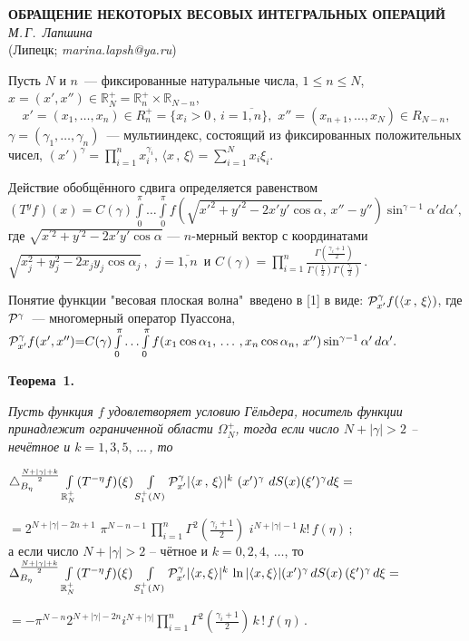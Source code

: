 \begin{center}{
	\bf
	ОБРАЩЕНИЕ НЕКОТОРЫХ ВЕСОВЫХ ИНТЕГРАЛЬНЫХ ОПЕРАЦИЙ
} \\
{\it М.\,Г.~Лапшина } \\
(Липецк; {\it marina.lapsh@ya.ru})
\end{center}


Пусть $N$ и $n$~--- фиксированные натуральные числа, $1\leqslant n\leqslant N $,
$x=(x',x'')\in \mathbb{R}_N^+=\mathbb{R}_n^+\times\mathbb{R}_{N-n}$,
$$x'{=}(x_1,\ldots,x_n)\in R_n^+{=}\{x_i{>}0\,,\, i{=}\overline{1,n}\},\,\,
x''{=}(x_{n+1},\ldots,x_N)\in R_{N{-}n},$$
$\gamma{=}(\gamma_1,\ldots,\gamma_n)$~--- мультииндекс, состоящий из
фиксированных положительных чисел, $(x')^\gamma=\prod_{i=1}^n x_i^{\gamma_i}$,
$\langle x\,,\,\xi\rangle{=}\sum_{i=1}^{N}x_i\xi_i$.

Действие обобщённого сдвига определяется  равенством\\
$
(T^y f)(x){=}C(\gamma)\int\limits_{0}^{\pi}
\ldots \int\limits_{0}^{\pi}
f\left(\sqrt{x'^2{+}y'^2{-}2x'y'\cos\alpha},\,
 x''{-}y''\right)\sin^{\gamma-1}\alpha' d\alpha',
$ \\
где $\sqrt{x^{'2}+y^{'2}-2x'y'\cos\alpha}$ --- $n$-мерный вектор  с координатами\\
$\sqrt{x_j^{2}+y_j^{2}-2x_jy_j\cos\alpha_j}\,,\,\,\, j=\overline{1,n}$\, и
$
C(\gamma)=\prod\limits_{i=1}^n\frac{\Gamma\left(\frac{\gamma_i+1}{2}\right)}
{\Gamma\left(\frac{1}{2}\right)\Gamma\left(\frac{\gamma_i}{2}\right)}\,.
$

Понятие функции "весовая плоская волна"\, введено в [1] в виде:
${\cal P}^\gamma_{x'} f(\langle x\,,\,\xi\rangle)$,
где ${\cal P}^\gamma$~--- многомерный оператор Пуассона,\\
$
{\cal P}^\gamma_{x'} f(x',x''){=}C(\gamma)
\int\limits_0^\pi\ldots \int\limits_0^\pi f(x_1\cos\alpha_1,\,\ldots\,,x_n\cos\alpha_n,\,x'')
\sin^{\gamma-1}\alpha'\,d\alpha'.
$

\smallskip
\textbf{Теорема~1.}
{\it Пусть функция $f$ удовлетворяет условию Гёльдера, носитель функции принадлежит ограниченной области $\Omega_{N}^+$,
тогда если число $N+|\gamma|>2$ -- нечётное и $k=1,3,5,\,\ldots\,$, то

$
\triangle_{B_{\eta}}^{\frac{N+|\gamma|+k}{2}}
\int\limits_{\mathbb{R}_N^+}(T^{-\eta}f)(\xi)
\int\limits_{S^+_1(N)}{\cal P}_{x'}^\gamma |\langle x\,,\,\xi\rangle|^k\,\,
(x')^\gamma\,\,dS(x)(\xi')^{\gamma} d\xi=
$

$
=2^{N+|\gamma|-2n+1}\,\,
\pi^{N-n-1}\,
\prod\limits_{i=1}^{n}\Gamma^2\left(\frac{\gamma_i+1}{2}\right)
\,\,i^{N+|\gamma|-1}\,k!
\, f(\eta)\,;
$\\
а если
число $N+|\gamma|>2$ -- чётное и $k=0,2,4,\,\ldots$, то\\
$
\Delta_{B_{\eta}}^{\frac{N+|\gamma|+k}{2}}\int\limits_{\mathbb{R}_N^+}(T^{-\eta}f)(\xi)
\int\limits_{S_1^+(N)}{\cal P}_{x'}^\gamma |\langle x,\xi \rangle|^k\,\ln|\langle x,\xi \rangle|
(x')^{\gamma}\,dS(x)\,(\xi')^{\gamma}\,d\xi=
$

$
=-\pi^{N-n} 2^{N+|\gamma|-2n} i^{N+|\gamma|}
\prod\limits_{i=1}^{n}\Gamma^2\left(\frac{\gamma_i+1}{2}\right)\,k\,!\,f(\eta)\,.
$}

